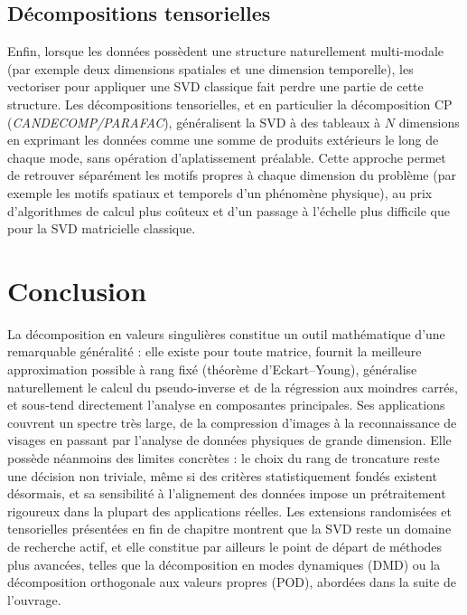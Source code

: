\documentclass[11pt,a4paper]{article}
\begin{document}
\subsection{Décompositions tensorielles}

Enfin, lorsque les données possèdent une structure naturellement multi-modale (par exemple deux dimensions spatiales et une dimension temporelle), les vectoriser pour appliquer une SVD classique fait perdre une partie de cette structure. Les décompositions tensorielles, et en particulier la décomposition CP (\emph{CANDECOMP/PARAFAC}), généralisent la SVD à des tableaux à $N$ dimensions en exprimant les données comme une somme de produits extérieurs le long de chaque mode, sans opération d'aplatissement préalable. Cette approche permet de retrouver séparément les motifs propres à chaque dimension du problème (par exemple les motifs spatiaux et temporels d'un phénomène physique), au prix d'algorithmes de calcul plus coûteux et d'un passage à l'échelle plus difficile que pour la SVD matricielle classique.

\section{Conclusion}

La décomposition en valeurs singulières constitue un outil mathématique d'une remarquable généralité : elle existe pour toute matrice, fournit la meilleure approximation possible à rang fixé (théorème d'Eckart--Young), généralise naturellement le calcul du pseudo-inverse et de la régression aux moindres carrés, et sous-tend directement l'analyse en composantes principales. Ses applications couvrent un spectre très large, de la compression d'images à la reconnaissance de visages en passant par l'analyse de données physiques de grande dimension. Elle possède néanmoins des limites concrètes : le choix du rang de troncature reste une décision non triviale, même si des critères statistiquement fondés existent désormais, et sa sensibilité à l'alignement des données impose un prétraitement rigoureux dans la plupart des applications réelles. Les extensions randomisées et tensorielles présentées en fin de chapitre montrent que la SVD reste un domaine de recherche actif, et elle constitue par ailleurs le point de départ de méthodes plus avancées, telles que la décomposition en modes dynamiques (DMD) ou la décomposition orthogonale aux valeurs propres (POD), abordées dans la suite de l'ouvrage.
\end{document}
